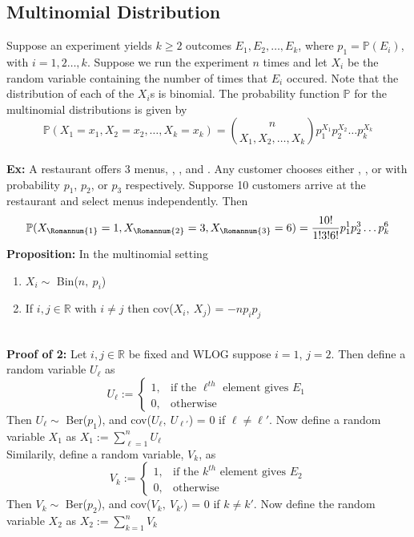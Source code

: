 \documentclass{article}
\newcommand{\tb}[1]{\textbf{#1}}
\newcommand{\Rn}[1]{\Romannum{#1}}
\newcommand{\R}{\mathbb{R}}
\newcommand{\bbP}{\mathbb{P}}
\newcommand{\prop}{\textbf{Proposition: }}
\newcommand{\exx}{\textbf{Ex: }}
\begin{document}
\subsection{Multinomial Distribution}
Suppose an experiment yields $k \geq 2$ outcomes $E_{1}, E_{2}, \dots, E_{k}$, where $p_{1} = \bbP(E_{i})$, with $i = 1, 2 \dots, k$. Suppose we run the experiment $n$ times and let $X_{i}$ be the random variable containing the number of times that $E_{i}$ occured. Note that the distribution of each of the $X_{i}$s is binomial. The probability function $\bbP$ for the multinomial distributions is given by
\[ \bbP(X_{1} = x_{1}, X_{2} = x_{2}, \dots, X_{k} = x_{k} ) = {n\choose{X_{1}, X_{2}, \dots, X_{k}}}p_{1}^{X_{1}}p_{2}^{X_{2}}\dots p_{k}^{X_{k}}\]\\
\exx A restaurant offers 3 menus, \Rn{1}, \Rn{2}, and \Rn{3}. Any customer chooses either \Rn{1}, \Rn{2}, or \Rn{3} with probability $p_{1}$, $p_{2}$, or $p_{3}$ respectively. Supporse 10 customers arrive at the restaurant and select menus independently. Then
\[\bbP(X_{\text{\Rn{1}}} = 1 , X_{\text{\Rn{2}}} = 3, X_{\text{\Rn{3}}} = 6) = \frac{10!}{1!3!6!}p_{1}^{1}p_{2}^{3}\dots p_{k}^{6}\]
\prop In the multinomial setting
\begin{enumerate}
	\item $X_{i} \sim$ Bin($n,\ p_{i}$)
	\item If $i, j \in \R$ with $i \neq j$ then cov($X_{i},\ X_{j}$) = $-np_{i}p_{j}$
\end{enumerate}
\ \\
\tb{Proof of 2:} Let $i, j \in \R$ be fixed and WLOG suppose $i = 1$, $j = 2$. Then define a random variable $U_{\ell}$ as
\[
U_{\ell} := 
\begin{cases}
	1, &\text{if the $\ell^{th}$ element gives $E_{1}$}\\
	0,  &\text{otherwise}
\end{cases}
\]
Then $U_{\ell} \sim$ Ber($p_{1}$), and cov($U_{\ell},\ U_{\ell'}$) = 0 if $\ell \neq \ell'$. Now define a random variable $X_{1}$ as $\displaystyle X_{1} := \sum_{\ell=1}^{n} U_{\ell}$\\
Similarily, define a random variable, $V_{k}$, as
\[
V_{k} := 
\begin{cases}
	1, &\text{if the $k^{th}$ element gives $E_{2}$}\\
	0, &\text{otherwise}
\end{cases}
\]
Then $V_{k} \sim$ Ber($p_{2}$), and cov($V_{k},\ V_{k'}$) = 0 if $k \neq k'$. Now define the random variable $X_{2}$ as $\displaystyle X_{2} := \sum_{k=1}^{n} V_{k}$\\
\end{document}

